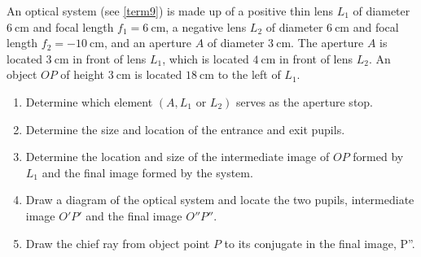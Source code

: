 \documentclass[english,a4paper,12pt]{report}
\begin{document}
{An optical system (see \cref{term9}) is made up of a positive thin lens \(L_{1} \) of diameter \(\SI{6}{\cm} \) and focal length \(f_1 = \SI{6}{\cm} \), a negative lens \(L_2 \) of diameter \(\SI{6}{\cm} \) and focal length \(f_2 = -\SI{10}{\cm} \), and an aperture \(A\) of diameter \(\SI{3}{\cm} \). The aperture \(A\) is located \(\SI{3}{\cm} \) in front of lens \(L_1 \), which is located \(\SI{4}{\cm} \) in front of lens \(L_2 \). An object \(OP\) of height \(\SI{3}{\cm} \) is located \(\SI{18}{\cm} \) to the left of \(L_1 \). 

\begin{enumerate}
    \item Determine which element \((A,L_1 \text { or } L_2 )\) serves as the aperture stop.
    \item Determine the size and location of the entrance and exit pupils.
    \item Determine the location and size of the intermediate image of \(OP\) formed by \(L_1 \) and the final image formed by the system.
    \item Draw a diagram of the optical system and locate the two pupils, intermediate image \(O'P'\) and the final image \(O''P''\).
    \item Draw the chief ray from object point \(P\) to its conjugate in the final image, P''.   
\end{enumerate}
~
}
\end{document}
